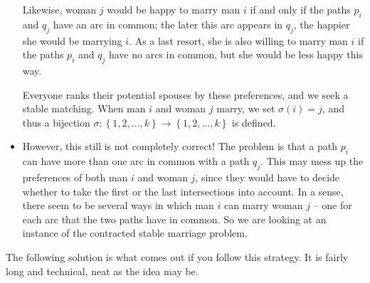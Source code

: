 \documentclass[numbers=enddot,12pt,final,onecolumn,notitlepage]{scrartcl}%
\theoremstyle{definition}
\newcommand{\set}[1]{\left\{ #1 \right\}}
\newcommand{\tup}[1]{\left( #1 \right)}
\begin{document}
\begin{itemize}
      Likewise, woman $j$ would be happy to marry man $i$ if and only
      if the paths $p_i$ and $q_j$ have an arc in common; the later
      this arc appears in $q_j$, the happier she would be marrying
      $i$.
      As a last resort, she is also willing to marry man $i$ if the
      paths $p_i$ and $q_j$ have no arcs in common, but she would be
      less happy this way. \par
      Everyone ranks their potential spouses by these preferences, and
      we seek a stable matching.
      When man $i$ and woman $j$ marry, we set
      $\sigma \tup{i} = j$, and thus a bijection
      $\sigma : \set{1, 2, \ldots, k} \to \set{1, 2, \ldots, k}$
      is defined.
\item However, this still is not completely correct!
      The problem is that a path $p_i$ can have more than one arc in
      common with a path $q_j$.
      This may mess up the preferences of both man $i$ and woman $j$,
      since they would have to decide whether to take the first or the
      last intersections into account.
      In a sense, there seem to be several ways in which man $i$ can
      marry woman $j$ -- one for each arc that the two paths have in
      common.
      So we are looking at an instance of the contracted stable
      marriage problem.
\end{itemize}

The following solution is what comes out if you follow this strategy.
It is fairly long and technical, neat as the idea may be.
\end{document}
